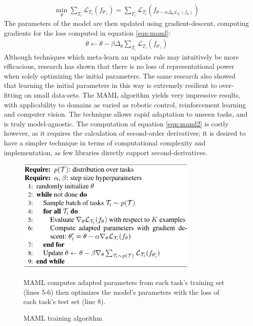 \documentclass{report}
\begin{document}
	\begin{align}
	\min_\theta
	\sum_{T_i} \mathcal{L}_{T_{i}}(f_{\theta'_i}) = 
	\sum_{T_i}\mathcal{L}_{T_{i}}(f_{\theta-\alpha\Delta_\theta\mathcal{L}_{T_{i}}(f_\theta)}) \label{eqn:maml}
	\end{align}
	The parameters of the model are then updated using gradient-descent, computing gradients for the loss computed in equation \ref{eqn:maml}:
	\begin{align}
	\theta \gets \theta - \beta\Delta_\theta \sum_{T_i} \mathcal{L}_{T_{i}}(f_{\theta'_i}) \label{eqn:maml2}
	\end{align}
	Although techniques which meta-learn an update rule may intuitively be more efficacious, research \parencite{universality} has shown that there is no loss of representational power when solely optimizing the initial parameters. The same research also showed that learning the initial parameters in this way is extremely resilient to over-fitting on small data-sets. The MAML algorithm yields very impressive results, with applicability to domains as varied as robotic control, reinforcement learning and computer vision. The technique allows rapid adaptation to unseen tasks, and is truly model-agnostic. The computation of equation \ref{eqn:maml2} is costly however, as it requires the calculation of second-order derivatives; it is desired to have a simpler technique in terms of computational complexity and implementation, as few libraries directly support second-derivatives. \par
	\begin{figure}[h]
		\centering
		\includegraphics[width=9cm]{mamlalgo}
		\caption{MAML training algorithm}
		MAML computes adapted parameters from each task's training set (lines 5-6) then optimizes the model's parameters with the loss of each task's test set (line 8).
		\label{fig:maml-algo:1}
	\end{figure}
	
\end{document}
